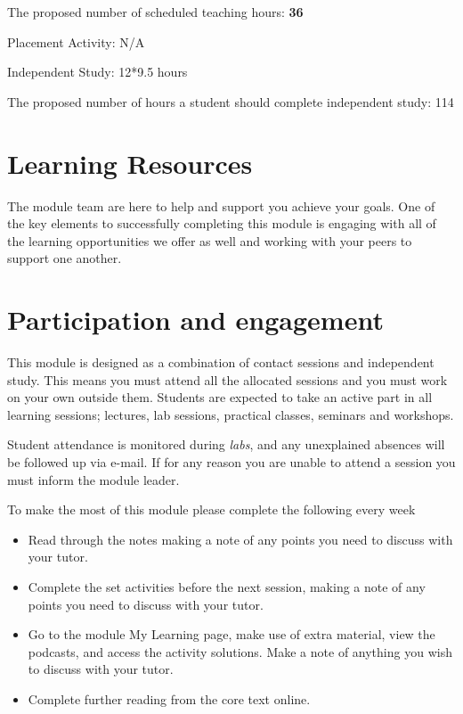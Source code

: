 \documentclass{MDXHandbook}
\begin{document}
{The proposed number of scheduled teaching hours: {\bf 36}

Placement Activity: N/A

Independent Study: 12*9.5 hours

The proposed number of hours a student should complete independent study: 114

\section{Learning Resources}
The module team are here to help and support you achieve your goals. One of the key elements to successfully completing this module is engaging with all of the learning opportunities we offer as well and working with your peers to support one another. 

\section*{Participation and engagement}

This module is designed as a combination of contact sessions and independent study. This means you must attend all the allocated sessions and you must work on your own outside them. Students are expected to take an active part in all learning sessions;  lectures, lab sessions, practical classes, seminars and workshops. 

Student attendance is monitored during  \emph{labs},  and any unexplained absences will be followed up via e-mail. If for any reason you are unable to attend a session you must inform the module leader.

To make the most of this module please complete the following every week
\begin{itemize}
\item Read through the notes making a note of any points you need to discuss with your tutor.
\item Complete the set activities before the next session, making a note of any points you need to discuss with your tutor.
\item Go to the module My Learning page, make use of extra material, view the podcasts, and access the activity solutions. Make a note of anything you wish to discuss with your tutor.
\item Complete further reading from the core text online.
\end{itemize}

}
\end{document}
